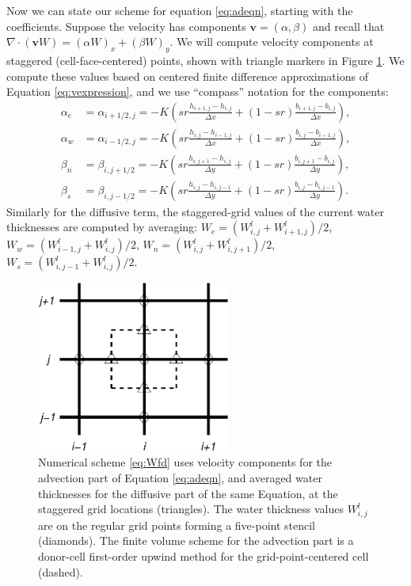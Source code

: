 \documentclass[12pt,final]{amsart}%
\newcommand\bv{\mathbf{v}}
\newcommand{\Div}{\nabla\cdot}
\newcommand{\grad}{\nabla}
\begin{document}
Now we can state our scheme for equation \eqref{eq:adeqn}, starting with the coefficients.  Suppose the velocity has components $\bv = (\alpha,\beta)$ and recall that $\Div \left(\bv W\right) = (\alpha W)_x + (\beta W)_y$.  We will compute velocity components at staggered (cell-face-centered) points, shown with triangle markers in Figure \ref{fig:stencil}.  We compute these values based on centered finite difference approximations of Equation \eqref{eq:vexpression}, and we use ``compass'' notation for the components:
\begin{align*}
\alpha_e &= \alpha_{i+1/2,j} = -K \left(sr \frac{h_{i+1,j}-h_{i,j}}{\Delta x} + (1-sr) \frac{b_{i+1,j}-b_{i,j}}{\Delta x}\right), \\
\alpha_w &= \alpha_{i-1/2,j} = -K \left(sr \frac{h_{i,j}-h_{i-1,j}}{\Delta x} + (1-sr) \frac{b_{i,j}-b_{i-1,j}}{\Delta x}\right), \\
\beta_n  &= \beta_{i,j+1/2} = -K \left(sr \frac{h_{i,j+1}-h_{i,j}}{\Delta y} + (1-sr) \frac{b_{i,j+1}-b_{i,j}}{\Delta y}\right), \\
\beta_s  &= \beta_{i,j-1/2} = -K \left(sr \frac{h_{i,j}-h_{i,j-1}}{\Delta y} + (1-sr) \frac{b_{i,j}-b_{i,j-1}}{\Delta y}\right).
\end{align*}  
Similarly for the diffusive term, the staggered-grid values of the current water thicknesses are computed by averaging: $W_e = (W_{i,j}^l + W_{i+1,j}^l)/2$, $W_w = (W_{i-1,j}^l + W_{i,j}^l)/2$, $W_n = (W_{i,j}^l + W_{i,j+1}^l)/2$, $W_s = (W_{i,j-1}^l + W_{i,j}^l)/2$.

\begin{figure}[ht]
\centering
\includegraphics[width=2.5in,keepaspectratio=true]{figs/diffstencil}
\bigskip
\caption{Numerical scheme \eqref{eq:Wfd} uses velocity components for the advection part of Equation \eqref{eq:adeqn}, and averaged water thicknesses for the diffusive part of the same Equation, at the staggered grid locations (triangles).  The water thickness values $W_{i,j}^l$ are on the regular grid points forming a five-point stencil (diamonds).  The finite volume scheme for the advection part is a donor-cell first-order upwind method for the grid-point-centered cell (dashed).}
\label{fig:stencil}
\end{figure}
\end{document}
